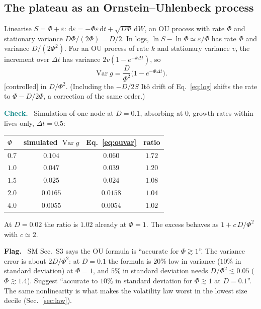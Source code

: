 \documentclass[11pt]{article}
\newcommand{\Var}{\operatorname{Var}}
\newcommand{\dd}{\mathrm d}
\newcommand{\controlled}{\textsf{\small[controlled]}}
\newenvironment{verify}{\par\medskip\noindent\textcolor{teal}{\textbf{Check.}}\ }{\par\medskip}
\newenvironment{flag}{\par\medskip\noindent\textcolor{red!70!black}{\textbf{Flag.}}\ }{\par\medskip}
\begin{document}
\subsection{The plateau as an Ornstein--Uhlenbeck process}

Linearise $S=\Phi+\varepsilon$: $\dd\varepsilon=-\Phi\varepsilon\,\dd t+\sqrt{D\Phi}\,\dd W$, an OU process with rate $\Phi$ and stationary
variance $D\Phi/(2\Phi)=D/2$.  In logs, $\ln S-\ln\Phi\simeq\varepsilon/\Phi$ has rate $\Phi$ and variance $D/(2\Phi^2)$.  For an OU
process of rate $k$ and stationary variance $v$, the increment over $\Delta t$ has variance $2v(1-e^{-k\Delta t})$, so
\begin{equation}
\Var g=\frac{D}{\Phi^2}\big(1-e^{-\Phi\Delta t}\big).
\label{eq:ouvar}
\end{equation}
\controlled{} in $D/\Phi^2$.  (Including the $-D/2S$ It\^o drift of Eq.~\eqref{eq:log} shifts the rate to $\Phi-D/2\Phi$, a
correction of the same order.)

\begin{verify}
Simulation of one node at $D=0.1$, absorbing at $0$, growth rates within lives only, $\Delta t=0.5$:
\begin{center}
\begin{tabular}{lccc}
\toprule
$\Phi$ & simulated $\Var g$ & Eq.~\eqref{eq:ouvar} & ratio\\
\midrule
$0.7$ & $0.104$ & $0.060$ & $1.72$\\
$1.0$ & $0.047$ & $0.039$ & $1.20$\\
$1.5$ & $0.025$ & $0.024$ & $1.08$\\
$2.0$ & $0.0165$ & $0.0158$ & $1.04$\\
$4.0$ & $0.0055$ & $0.0054$ & $1.02$\\
\bottomrule
\end{tabular}
\end{center}
At $D=0.02$ the ratio is $1.02$ already at $\Phi=1$.  The excess behaves as $1+c\,D/\Phi^2$ with $c\simeq2$.
\end{verify}
\begin{flag}
SM Sec.~S3 says the OU formula is ``accurate for $\Phi\gtrsim1$''.  The variance error is about $2D/\Phi^2$: at $D=0.1$ the
formula is $20\%$ low in variance ($10\%$ in standard deviation) at $\Phi=1$, and $5\%$ in standard deviation needs
$D/\Phi^2\lesssim0.05$ ($\Phi\gtrsim1.4$).  Suggest ``accurate to $10\%$ in standard deviation for $\Phi\gtrsim1$ at $D=0.1$''.  The same
nonlinearity is what makes the volatility law worst in the lowest size decile (Sec.~\ref{sec:law}).
\end{flag}
\end{document}
